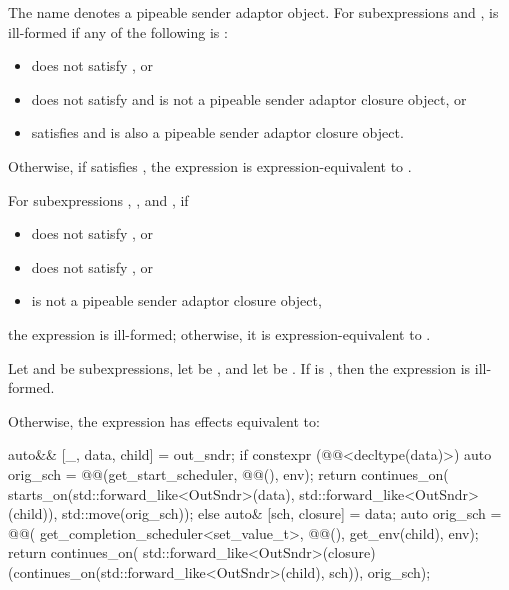 \pnum
The name  denotes a pipeable sender adaptor object.
For subexpressions  and ,
 is ill-formed if any of the following is :
\begin{itemize}
\item
{} does not satisfy , or
\item
{} does not satisfy  and
 is not
a pipeable sender adaptor closure object, or
\item
{} satisfies  and
is also a pipeable sender adaptor closure object.
\end{itemize}

\pnum
Otherwise, if  satisfies ,
the expression  is expression-equivalent to
.

\pnum
For subexpressions , , and , if
\begin{itemize}
\item
{} does not satisfy , or
\item
{} does not satisfy , or
\item
{} is not a pipeable sender adaptor closure object,
\end{itemize}
the expression  is ill-formed;
otherwise, it is expression-equivalent to
.

\pnum
Let  and  be subexpressions,
let  be , and
let  be .
If  is ,
then the expression  is ill-formed.

\pnum
Otherwise, the expression 
has effects equivalent to:
\begin{codeblock}
auto&& [_, data, child] = out_sndr;
if constexpr (@@<decltype(data)>) {
  auto orig_sch = @@(get_start_scheduler, @@(), env);
  return continues_on(
    starts_on(std::forward_like<OutSndr>(data), std::forward_like<OutSndr>(child)),
    std::move(orig_sch));
} else {
  auto& [sch, closure] = data;
  auto orig_sch = @@(
    get_completion_scheduler<set_value_t>, @@(), get_env(child), env);
  return continues_on(
    std::forward_like<OutSndr>(closure)(continues_on(std::forward_like<OutSndr>(child), sch)),
    orig_sch);
}
\end{codeblock}


